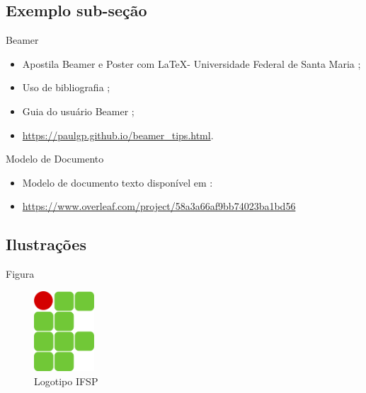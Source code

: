 \documentclass[%
    english,
    brazil]{ifsp-spo-beamer}
\begin{document}
\subsection{Exemplo sub-seção}

\begin{frame}{Beamer} 
\begin{itemize}
  \item Apostila Beamer e Poster com \LaTeX - Universidade Federal de Santa Maria \cite{apostila-beamer-ufsm};
  \item Uso de bibliografia \cite{minicurso-latex-beamer-aula5};
  \item Guia do usuário Beamer \cite{beamer-user-guide};
  \item \url{https://paulgp.github.io/beamer_tips.html}.
\end{itemize}
\end{frame}

\begin{frame}{Modelo de Documento} 
\begin{itemize}
  \item Modelo de documento texto disponível em : 
  \item \url{https://www.overleaf.com/project/58a3a66af9bb74023ba1bd56}
\end{itemize}
\end{frame}

\subsection{Ilustrações}

\begin{frame}{Figura}

    \begin{figure}
        \centering
    	\caption{\label{fig_logo}Logotipo IFSP}
    	\includegraphics[width=0.2\textwidth]{if-logo-beamer.png}
    \end{figure}

\end{frame}
\end{document}
